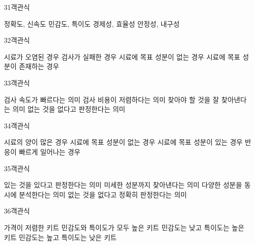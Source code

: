 \documentclass[fs9,seriesRus]{korfarm-base}
\begin{document}
\begin{kfQBlock}{31}{객관식}
\begin{kfChoices}
\kfChoice 정확도, 신속도
\kfChoice 민감도, 특이도
\kfChoice 경제성, 효율성
\kfChoice 안정성, 내구성
\end{kfChoices}
\end{kfQBlock}
\begin{kfQBlock}{32}{객관식}
\begin{kfChoices}
\kfChoice 시료가 오염된 경우
\kfChoice 검사가 실패한 경우
\kfChoice 시료에 목표 성분이 없는 경우
\kfChoice 시료에 목표 성분이 존재하는 경우
\end{kfChoices}
\end{kfQBlock}
\begin{kfQBlock}{33}{객관식}
\begin{kfChoices}
\kfChoice 검사 속도가 빠르다는 의미
\kfChoice 검사 비용이 저렴하다는 의미
\kfChoice 찾아야 할 것을 잘 찾아낸다는 의미
\kfChoice 없는 것을 없다고 판정한다는 의미
\end{kfChoices}
\end{kfQBlock}
\begin{kfQBlock}{34}{객관식}
\begin{kfChoices}
\kfChoice 시료의 양이 많은 경우
\kfChoice 시료에 목표 성분이 없는 경우
\kfChoice 시료에 목표 성분이 있는 경우
\kfChoice 반응이 빠르게 일어나는 경우
\end{kfChoices}
\end{kfQBlock}
\begin{kfQBlock}{35}{객관식}
\begin{kfChoices}
\kfChoice 있는 것을 있다고 판정한다는 의미
\kfChoice 미세한 성분까지 찾아낸다는 의미
\kfChoice 다양한 성분을 동시에 분석한다는 의미
\kfChoice 없는 것을 없다고 정확히 판정한다는 의미
\end{kfChoices}
\end{kfQBlock}
\begin{kfQBlock}{36}{객관식}
\begin{kfChoices}
\kfChoice 가격이 저렴한 키트
\kfChoice 민감도와 특이도가 모두 높은 키트
\kfChoice 민감도는 낮고 특이도는 높은 키트
\kfChoice 민감도는 높고 특이도는 낮은 키트
\end{kfChoices}
\end{kfQBlock}
\end{document}
